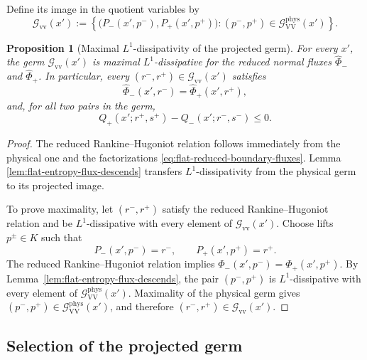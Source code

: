 \documentclass[11pt]{amsart}
\numberwithin{equation}{section}
\theoremstyle{plain}
\newtheorem{proposition}[theorem]{Proposition}
\theoremstyle{definition}
\theoremstyle{remark}
\begin{document}
Define its image in the quotient variables by
\begin{equation}
\label{eq:flat-projected-vv-germ}
    \mathcal G_{\mathrm{vv}}(x')
    :=
    \left\{
        \bigl(P_-(x',p^-),P_+(x',p^+)\bigr):
        (p^-,p^+)
        \in
        \mathcal G_{\mathrm{VV}}^{\mathrm{phys}}(x')
    \right\}.
\end{equation}

\begin{proposition}[Maximal \(L^1\)-dissipativity of the projected germ]
\label{prop:flat-projected-germ-maximal}
For every \(x'\), the germ \(\mathcal G_{\mathrm{vv}}(x')\) is maximal
\(L^1\)-dissipative for the reduced normal fluxes
\(\widehat\Phi_-\) and \(\widehat\Phi_+\). In particular, every
\((r^-,r^+)\in\mathcal G_{\mathrm{vv}}(x')\) satisfies
\begin{equation}
\label{eq:flat-reduced-rh}
    \widehat\Phi_-(x',r^-)
    =
    \widehat\Phi_+(x',r^+),
\end{equation}
and, for all two pairs in the germ,
\begin{equation}
\label{eq:flat-germ-dissipativity}
    Q_+(x';r^+,s^+)
    -
    Q_-(x';r^-,s^-)
    \leq0.
\end{equation}
\end{proposition}

\begin{proof}
The reduced Rankine--Hugoniot relation follows immediately from the physical
one and the factorizations
\eqref{eq:flat-reduced-boundary-fluxes}. Lemma
\ref{lem:flat-entropy-flux-descends} transfers \(L^1\)-dissipativity from the
physical germ to its projected image.

To prove maximality, let \((r^-,r^+)\) satisfy the reduced
Rankine--Hugoniot relation and be \(L^1\)-dissipative with every element of
\(\mathcal G_{\mathrm{vv}}(x')\). Choose lifts \(p^\pm\in K\) such that
\[
    P_-(x',p^-)=r^-,
    \qquad
    P_+(x',p^+)=r^+.
\]
The reduced Rankine--Hugoniot relation implies
\(\Phi_-(x',p^-)=\Phi_+(x',p^+)\). By
Lemma~\ref{lem:flat-entropy-flux-descends}, the pair \((p^-,p^+)\) is
\(L^1\)-dissipative with every element of
\(\mathcal G_{\mathrm{VV}}^{\mathrm{phys}}(x')\). Maximality of the
physical germ gives
\((p^-,p^+)\in\mathcal G_{\mathrm{VV}}^{\mathrm{phys}}(x')\), and therefore
\((r^-,r^+)\in\mathcal G_{\mathrm{vv}}(x')\).
\end{proof}

\subsection{Selection of the projected germ}
\label{subsec:flat-vv-germ-selection}
\end{document}
